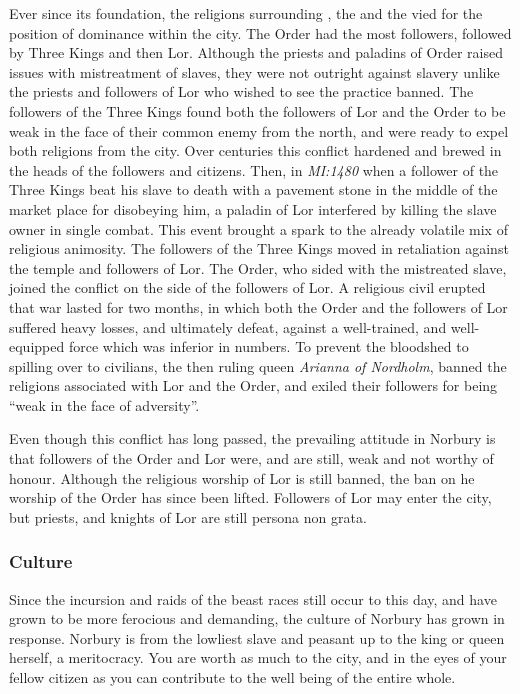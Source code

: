 Ever since its foundation, the religions surrounding , the
 and the  vied for the position of
dominance within the city. The Order had the most followers, followed by Three
Kings and then Lor. Although the priests and paladins of Order raised issues
with mistreatment of slaves, they were not outright against slavery unlike
the priests and followers of Lor who wished to see the practice banned. The
followers of the Three Kings found both the followers of Lor and the Order to
be weak in the face of their common enemy from the north, and were ready to
expel both religions from the city. Over centuries this conflict hardened and
brewed in the heads of the followers and citizens. Then, in \emph{MI:1480}
when a follower of the Three Kings beat his slave to death with a pavement
stone in the middle of the market place for disobeying him, a paladin of Lor
interfered by killing the slave owner in single combat. This event brought a
spark to the already volatile mix of religious animosity. The followers of the
Three Kings moved in retaliation against the temple and followers of Lor. The
Order, who sided with the mistreated slave, joined the conflict on the side of
the followers of Lor. A religious civil erupted that war lasted for two
months, in which both the Order and the followers of Lor suffered heavy losses,
and ultimately defeat, against a well-trained, and well-equipped force which
was inferior in numbers. To prevent the bloodshed to spilling over to
civilians, the then ruling queen \emph{Arianna of Nordholm}, banned the
religions associated with Lor and the Order, and exiled their followers for
being ``weak in the face of adversity''.

Even though this conflict has long passed, the prevailing attitude in Norbury
is that followers of the Order and Lor were, and are still, weak and not
worthy of honour. Although the religious worship of Lor is still banned, the
ban on he worship of the Order has since been lifted. Followers of Lor may
enter the city, but priests, and knights of Lor are still persona non grata.

\subsubsection{Culture}

Since the incursion and raids of the beast races still occur to this day, and
have grown to be more ferocious and demanding, the culture of Norbury has
grown in response. Norbury is from the lowliest slave and peasant up to the
king or queen herself, a meritocracy. You are worth as much to the city, and
in the eyes of your fellow citizen as you can contribute to the well being of
the entire whole.

